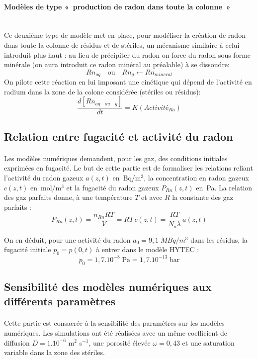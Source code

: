 \documentclass{article}
\begin{document}
\paragraph{Modèles de type « production de radon dans toute la colonne » \\ \\} Ce deuxième type de modèle met en place, pour modéliser la création de radon dans toute la colonne de résidus et de stériles, un mécanisme similaire à celui introduit plus haut : au lieu de précipiter du radon on force du radon sous forme minérale (on aura introduit ce radon minéral au préalable) à se dissoudre:
$$Rn_{aq} \quad \text{ou} \quad Rn_{g} \leftarrow Rn_{mineral}$$
On pilote cette réaction en lui imposant une cinétique qui dépend de l'activité en radium dans la zone de la colone considérée (stériles ou résidus):
$$ \frac{d\left[ Rn_{aq \quad ou \quad g} \right]}{dt}= K(Activité_{Ra}) $$


\subsection{Relation entre fugacité et activité du radon}
\label{annexe:fug_act}
\paragraph{} Les modèles numériques demandent, pour les gaz, des conditions initiales exprimées en fugacité. Le but de cette partie est de formaliser les relations reliant l’activité du radon gazeux $a(z,t)$ en~Bq/m$^3$, la concentration en radon gazeux $c(z,t)$ en~mol/m$^3$ et la fugacité du radon gazeux $P_{Rn} (z,t)$ en~Pa. La relation des gaz parfaits donne, à une température $T$ et avec $R$ la constante des gaz parfaits :
$$
P_{Rn} (z,t)=\frac{n_{Rn} RT}{V}=RT\,c(z,t)=\frac{RT}{N_a \lambda}\, a(z,t)
$$

On en déduit, pour une activité du radon $a_0=9,1 \; MBq/m^3$ dans les résidus, la fugacité initiale $p_0=p(0,t)$ à entrer dans le modèle HYTEC :
$$
p_0=1,7 .10^{-8} \; \text{Pa}=1,7 .10^{-13} \; \text{bar}
$$

\subsection{Sensibilité des modèles numériques aux différents paramètres}
\label{annexe:sens_numerique}

\paragraph{} Cette partie est consacrée à la sensibilité des paramètres sur les modèles numériques. Les simulations ont été réalisées avec un même coefficient de diffusion $D = 1.10^{-6}$ m$^2 \!$ s$^{-1}$, une porosité élevée $\omega = 0,43$ et une saturation variable dans la zone des stériles.
\end{document}
